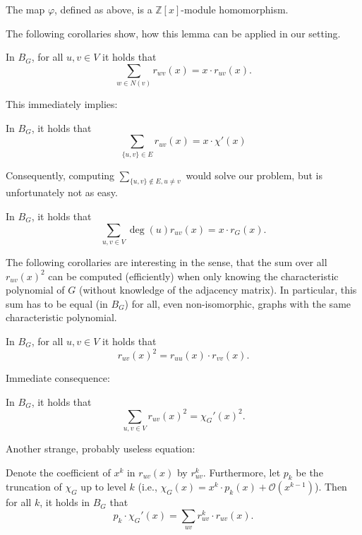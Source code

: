 \documentclass[a4paper,12pt]{article}
\begin{document}
\begin{lemma}
The map $\varphi$, defined as above, is a $\mathbb{Z}[x]$-module homomorphism.
\end{lemma}

The following corollaries show, how this lemma can be applied in our setting.

\begin{cor}
In $B_G$, for all $u,v\in V$ it holds that
$$
\sum_{w\in N(v)}r_{wv}(x) = x \cdot r_{uv}(x).
$$
\end{cor}
This immediately implies:
\begin{cor}
In $B_G$, it holds that
$$
\sum_{\{u,v\}\in E}r_{uv}(x) = x\cdot\chi'(x)
$$
\end{cor}

Consequently, computing $\sum_{\{u,v\}\notin E, u \neq v}$ would solve our problem, but is unfortunately not as easy.

\begin{cor}
In $B_G$, it holds that
$$
\sum_{u,v \in V} \deg(u)r_{uv}(x) = x \cdot r_G(x).
$$
\end{cor}

The following corollaries are interesting in the sense, that the sum over all $r_{uv}(x)^2$ can be computed (efficiently) when only knowing the characteristic polynomial of $G$ (without knowledge of the adjacency matrix). In particular, this sum has to be equal (in $B_G$) for all, even non-isomorphic, graphs with the same characteristic polynomial.

\begin{cor}
In $B_G$, for all $u,v \in V$ it holds that
$$
r_{uv}(x)^2 = r_{uu}(x) \cdot r_{vv}(x).
$$
\end{cor}

Immediate consequence:

\begin{cor}
In $B_G$, it holds that
$$
\sum_{u,v\in V}r_{uv}(x)^2 = \chi_G'(x)^2.
$$
\end{cor}

Another strange, probably useless equation:

\begin{cor}
Denote the coefficient of $x^k$ in $r_{uv}(x)$ by $r_{uv}^k$. Furthermore, let $p_k$ be the truncation of $\chi_G$ up to level $k$ (i.e., $\chi_G(x) = x^k \cdot p_k(x) + \mathcal{O}(x^{k-1})$). Then for all $k$, it holds in $B_G$ that
$$
p_k \cdot \chi_G'(x) = \sum_{uv}r_{uv}^k \cdot r_{uv}(x).
$$
\end{cor}
\end{document}
